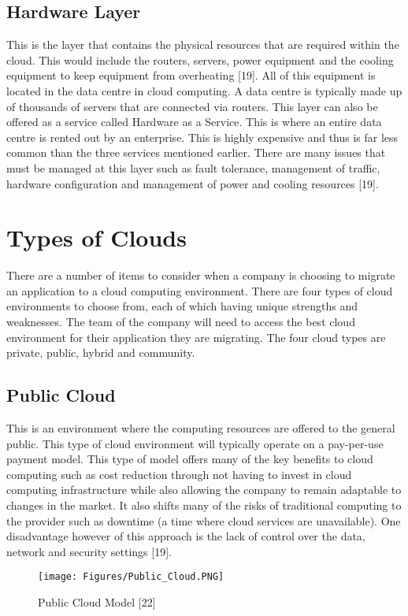 \documentclass[oneside,12pt]{Classes/RoboticsLaTeX}
\begin{document}
\subsection{Hardware Layer}
This is the layer that contains the physical resources that are required within the cloud. This would include the routers, servers, power equipment and the cooling equipment to keep equipment from overheating [19]. All of this equipment is located in the data centre in cloud computing. A data centre is typically made up of thousands of servers that are connected via routers. This layer can also be offered as a service called Hardware as a Service. This is where an entire data centre is rented out by an enterprise. This is highly expensive and thus is far less common than the three services mentioned earlier. There are many issues that must be managed at this layer such as fault tolerance, management of traffic, hardware configuration and management of power and cooling resources [19].


\section{Types of Clouds}
There are a number of items to consider when a company is choosing to migrate an application to a cloud computing environment. There are four types of cloud environments to choose from, each of which having unique strengths and weaknesses. The team of the company will need to access the best cloud environment for their application they are migrating. The four cloud types are private, public, hybrid and community. 

\subsection{Public Cloud}
This is an environment where the computing resources are offered to the general public. This type of cloud environment will typically operate on a pay-per-use payment model. This type of model offers many of the key benefits to cloud computing such as cost reduction through not having to invest in cloud computing infrastructure while also allowing the company to remain adaptable to changes in the market. It also shifts many of the risks of  traditional computing to the provider such as downtime (a time where cloud services are unavailable). One disadvantage however of this approach is the lack of control over the data, network and security settings [19]. 

\begin{figure}[h]
\centering
\texttt{[image: Figures/Public\_Cloud.PNG]}
\caption{Public Cloud Model [22]}
\end{figure}
\end{document}
